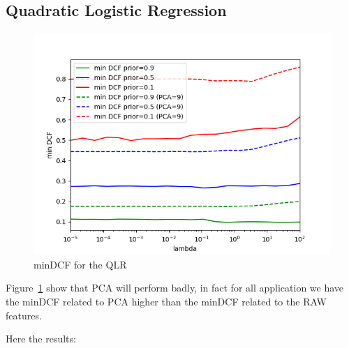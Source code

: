 \documentclass[english]{report}
\begin{document}
\clearpage

\subsection{Quadratic Logistic Regression}

\begin{figure}[h!]
    \includegraphics[scale = 0.5]{../../images/evaluation/QUAD_LR_PCA_minDCF_comparison}
    \centering
    \caption{minDCF for the QLR}
    \label{fig:QLR_eval}
\end{figure}

Figure~\ref{fig:QLR_eval} show that PCA will perform badly, in fact for all application we have the minDCF related
to PCA higher than the minDCF related to the RAW features. 

Here the results:
\end{document}
